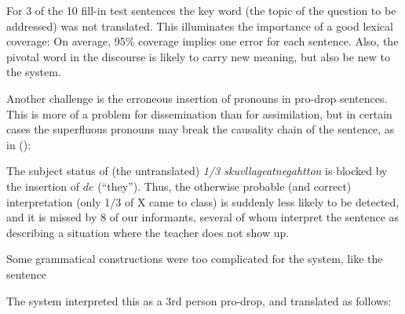 For 3 of the 10 fill-in test sentences the key word (the topic of
the question to be addressed) was not translated. This illuminates
the importance of a good lexical coverage: On average, 95\% coverage implies
one error for each sentence. Also, the pivotal word in the discourse
is likely to carry new meaning, but also be new to
the system. 

Another challenge is the erroneous insertion of pronouns in pro-drop
sentences. This is more of a problem for dissemination than for
assimilation, but in certain cases the superfluous pronouns may
break the causality chain of the sentence, as in ():

{}


The subject status of (the untranslated) \textit{1/3
  skuvllageatnegahtton} is blocked by the insertion of $de$
(``they''). Thus, the otherwise probable (and correct) interpretation
(only 1/3 of X came to class) is suddenly less likely to be detected,
and it is missed by 8 of our informants, several of whom interpret
the sentence as describing a situation where the teacher does not show up.



Some grammatical constructions were too complicated for the system, 
like the sentence



The system interpreted this as a 3rd person pro-drop, and translated
as follows:

